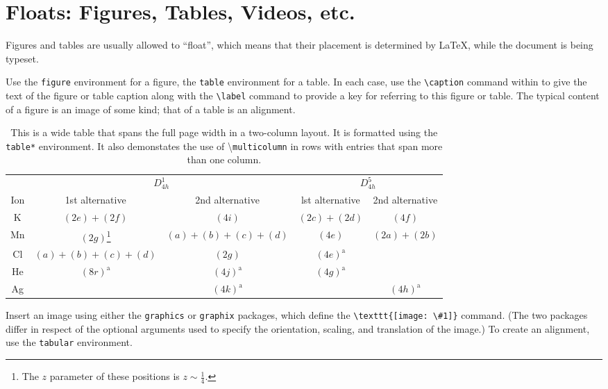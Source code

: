 \documentclass[%
 reprint,
 amsmath,amssymb,
 aps,
]{revtex4-2}
\begin{document}
\section{Floats: Figures, Tables, Videos, etc.}
Figures and tables are usually allowed to ``float'', which means that their
placement is determined by \LaTeX, while the document is being typeset. 

Use the \texttt{figure} environment for a figure, the \texttt{table} environment for a table.
In each case, use the \verb+\caption+ command within to give the text of the
figure or table caption along with the \verb+\label+ command to provide
a key for referring to this figure or table.
The typical content of a figure is an image of some kind; 
that of a table is an alignment.%
\begin{table*}
\caption{\label{tab:table3}This is a wide table that spans the full page
width in a two-column layout. It is formatted using the
\texttt{table*} environment. It also demonstates the use of
\textbackslash\texttt{multicolumn} in rows with entries that span
more than one column.}
\begin{ruledtabular}
\begin{tabular}{ccccc}
 &\multicolumn{2}{c}{$D_{4h}^1$}&\multicolumn{2}{c}{$D_{4h}^5$}\\
 Ion&1st alternative&2nd alternative&lst alternative
&2nd alternative\\ \hline
 K&$(2e)+(2f)$&$(4i)$ &$(2c)+(2d)$&$(4f)$ \\
 Mn&$(2g)$\footnote{The $z$ parameter of these positions is $z\sim\frac{1}{4}$.}
 &$(a)+(b)+(c)+(d)$&$(4e)$&$(2a)+(2b)$\\
 Cl&$(a)+(b)+(c)+(d)$&$(2g)$\footnotemark[1]
 &$(4e)^{\text{a}}$\\
 He&$(8r)^{\text{a}}$&$(4j)^{\text{a}}$&$(4g)^{\text{a}}$\\
 Ag& &$(4k)^{\text{a}}$& &$(4h)^{\text{a}}$\\
\end{tabular}
\end{ruledtabular}
\end{table*}

Insert an image using either the \texttt{graphics} or
\texttt{graphix} packages, which define the \verb+\texttt{[image: \#1]}+ command.
(The two packages differ in respect of the optional arguments 
used to specify the orientation, scaling, and translation of the image.) 
To create an alignment, use the \texttt{tabular} environment. 
\end{document}
